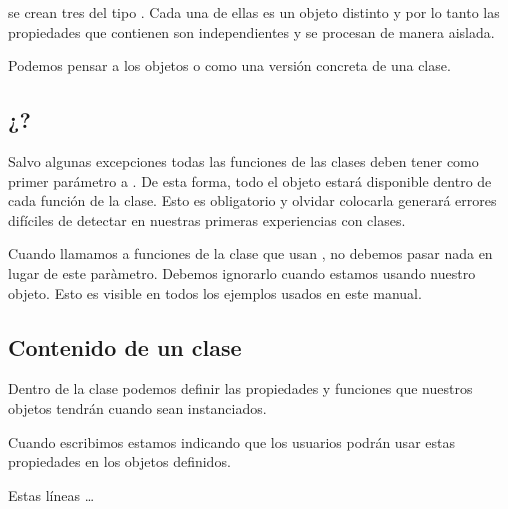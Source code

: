 \documentclass[a5paper,9pt,spanish]{sphinxmanual}
\begin{document}
\sphinxAtStartPar
se crean tres  del tipo . Cada una de ellas es un objeto distinto y por
lo tanto las propiedades que contienen son independientes y se procesan de manera aislada.

\begin{sphinxVerbatim}[commandchars=\\\{\}]
\end{sphinxVerbatim}

\sphinxAtStartPar
Podemos pensar a los objetos o  como una versión concreta de una clase.


\subsection{¿?}
\label{\detokenize{class:self}}
\sphinxAtStartPar
Salvo algunas excepciones todas las funciones de las clases deben tener como primer
parámetro a . De esta forma, todo el objeto estará disponible dentro de cada
función de la clase. Esto es obligatorio y olvidar colocarla generará errores difíciles
de detectar en nuestras primeras experiencias con clases.

\sphinxAtStartPar
Cuando llamamos a funciones de la clase que usan , no debemos pasar nada en
lugar de este paràmetro. Debemos ignorarlo cuando estamos usando nuestro objeto.
Esto es visible en todos los ejemplos usados en este manual.


\subsection{Contenido de un clase}
\label{\detokenize{class:contenido-de-un-clase}}
\sphinxAtStartPar
Dentro de la clase podemos definir las propiedades y funciones que nuestros objetos tendrán
cuando sean instanciados.

\sphinxAtStartPar
Cuando escribimos  estamos indicando que los usuarios podrán usar
estas propiedades en los objetos definidos.

\sphinxAtStartPar
Estas líneas …
\end{document}
